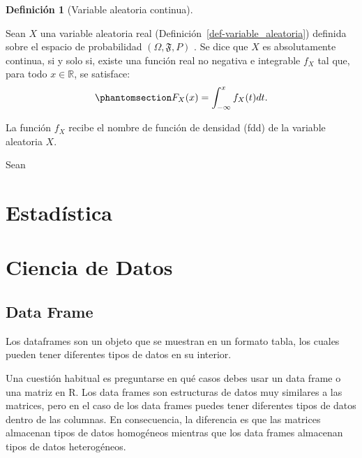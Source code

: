 \documentclass[
  us-letterpaper,
]{scrreprt}
\theoremstyle{definition}
\newtheorem{definition}{Definición}[chapter]
\theoremstyle{plain}
\theoremstyle{plain}
\theoremstyle{remark}
\begin{document}
\begin{definition}[Variable aleatoria
continua]\protect\hypertarget{def-var_alea_cont}{}\label{def-var_alea_cont}

Sean \(X\) una variable aleatoria real
(Definición~\ref{def-variable_aleatoria}) definida sobre el espacio de
probabilidad \((\Omega, \mathfrak{F}, P)\) . Se dice que \(X\) es
absolutamente continua, si y solo si, existe una función real no
negativa e integrable \(f_X\) tal que, para todo \(x \in \mathbb{R}\),
se satisface:
\begin{equation}\phantomsection\label{eq-var_ale_con}{F_X(x) = \int_{-\infty}^x f_X(t)dt.}\end{equation}

La función \(f_X\) recibe el nombre de función de densidad (fdd) de la
variable aleatoria \(X\).

\end{definition}

\begin{tcolorbox}[enhanced jigsaw, colbacktitle=quarto-callout-caution-color!10!white, titlerule=0mm, rightrule=.15mm, colback=white, left=2mm, opacitybacktitle=0.6, toprule=.15mm, colframe=quarto-callout-caution-color-frame, breakable, coltitle=black, title={Ejemplo (\textbf{\emph{Variable aleatoria continua}})}, bottomtitle=1mm, leftrule=.75mm, arc=.35mm, toptitle=1mm, bottomrule=.15mm, opacityback=0]

Sean

\end{tcolorbox}

\chapter{Estadística}\label{estaduxedstica}

\chapter{Ciencia de Datos}\label{ciencia-de-datos}

\section{Data Frame}\label{sec-dataframe}

Los dataframes son un objeto que se muestran en un formato tabla, los
cuales pueden tener diferentes tipos de datos en su interior.

Una cuestión habitual es preguntarse en qué casos debes usar un data
frame o una matriz en R. Los data frames son estructuras de datos muy
similares a las matrices, pero en el caso de los data frames puedes
tener diferentes tipos de datos dentro de las columnas. En consecuencia,
la diferencia es que las matrices almacenan tipos de datos homogéneos
mientras que los data frames almacenan tipos de datos heterogéneos.
\end{document}
